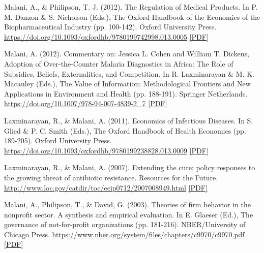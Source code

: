 \begin{tablist}
        \item[2012] \tab{}Malani, A., \& Philipson, T. J. (2012). The Regulation of Medical Products. In P. M. Danzon \& S. Nicholson (Eds.), The Oxford Handbook of the Economics of the Biopharmaceutical Industry (pp. 100-142). Oxford University Press. \href{https://doi.org/10.1093/oxfordhb/9780199742998.013.0005}{https://doi.org/10.1093/oxfordhb/9780199742998.013.0005} \href{https://github.com/anup-malani/website_personal/blob/main/publications/2012_MalaniPhilipson_Handbook_RegulationMedicalProducts.pdf}{[PDF]} 

        \item[2012] \tab{}Malani, A. (2012). Commentary on: Jessica L. Cohen and William T. Dickens, Adoption of Over-the-Counter Malaria Diagnostics in Africa: The Role of Subsidies, Beliefs, Externalities, and Competition. In R. Laxminarayan & M. K. Macauley (Eds.), The Value of Information: Methodological Frontiers and New Applications in Environment and Health (pp. 188-191). Springer Netherlands. \href{https://doi.org/10.1007/978-94-007-4839-2_7}{https://doi.org/10.1007/978-94-007-4839-2_7} \href{https://github.com/anup-malani/website_personal/blob/main/publications/2012_Malani_p188_CommentOnCoehnAnimalarialDiagnostics.pdf}{[PDF]} 

        \item[2011] \tab{}Laxminarayan, R., \& Malani, A. (2011). Economics of Infectious Diseases. In S. Glied \& P. C. Smith (Eds.), The Oxford Handbook of Health Economics (pp. 189-205). Oxford University Press. \href{https://doi.org/10.1093/oxfordhb/9780199238828.013.0009}{https://doi.org/10.1093/oxfordhb/9780199238828.013.0009} \href{https://github.com/anup-malani/website_personal/blob/main/publications/2011_LaxminarayanMalani_EconomicsInfectiousDiseaseHandbook.pdf}{[PDF]} 

        \item[2007] \tab{}Laxminarayan, R., \& Malani, A. (2007). Extending the cure: policy responses to the growing threat of antibiotic resistance. Resources for the Future. \href{http://www.loc.gov/catdir/toc/ecip0712/2007008949.html}{http://www.loc.gov/catdir/toc/ecip0712/2007008949.html} \href{https://github.com/anup-malani/website_personal/blob/main/publications/2007_LaxminarayanMalani_ExtendingCureBook.pdf}{[PDF]}

        \item[2003] \tab{}Malani, A., Philipson, T., \& David, G. (2003). Theories of firm behavior in the nonprofit sector. A synthesis and empirical evaluation. In E. Glaeser (Ed.), The governance of not-for-profit organizations (pp. 181-216). NBER/University of Chicago Press. \href{https://www.nber.org/system/files/chapters/c9970/c9970.pdf}{https://www.nber.org/system/files/chapters/c9970/c9970.pdf} \href{https://github.com/anup-malani/website_personal/blob/main/publications/2003_Malani_TheoryNonProfitOrgs.pdf}{[PDF]}


\end{tablist}
